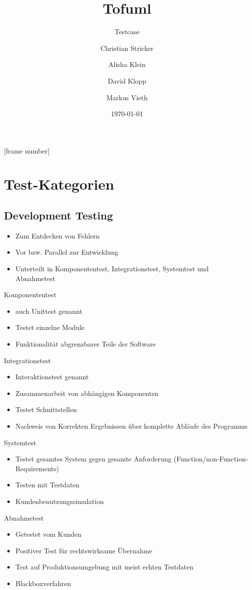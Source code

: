 \documentclass{beamer}
\title[Tofuml]{Tofuml}
\subtitle{Testcase}
\author[C. Stricker\and A. Klein\and D. Klopp\and M. Vieth]{Christian Stricker\and Alisha Klein\and David Klopp\and Markus Vieth}
\date[\today]{\today}
\begin{document}
	
	\frame{
		\titlepage
	}
	[frame number]
	
	
	\section{Test-Kategorien}
	\subsection{Development Testing}
	\begin{frame}%
		\begin{itemize}
		\item Zum Entdecken von Fehlern
		\item Vor bzw. Parallel zur Entwicklung
		\item Unterteilt in Komponententest, Integrationstest, Systemtest und Abnahmetest
	\end{itemize}
	\end{frame}
	
	\begin{frame}{Komponententest}
		\begin{itemize}
			\item auch Unittest genannt
			\item Testet einzelne Module
			\item Funktionalität abgrenzbarer Teile der Software
			
		\end{itemize}
	\end{frame}	
	\begin{frame}{Integrationstest}
		\begin{itemize}
			\item Interaktionstest genannt
			\item Zusammenarbeit von abhängigen Komponenten
			\item Testet Schnittstellen	
			\item Nachweis von Korrekten Ergebnissen über komplette Abläufe des Programms
		\end{itemize}
	\end{frame}
	\begin{frame}{Systemtest}
	\begin{itemize}
		\item Testet gesamtes System gegen gesamte Anforderung (Function/non-Function-Requirements)	
		\item Testen mit Testdaten
		\item Kundenbenutzungssimulation
	\end{itemize}
	\end{frame}	
	\begin{frame}{Abnahmetest}
		\begin{itemize}
			\item Getestet vom Kunden
			\item Positiver Test für rechtswirksame Übernahme
			\item Test auf Produktionsumgebung mit meist echten Testdaten
			\item Blackboxverfahren
		\end{itemize}
	\end{frame}
\end{document}
